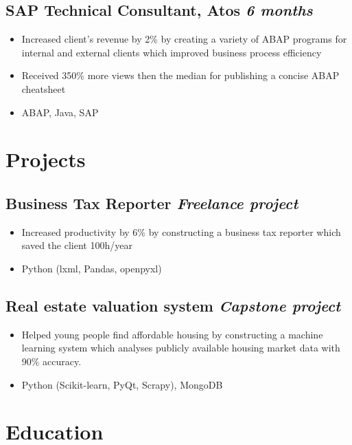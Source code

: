 \documentclass[a4paper]{article}
\newcommand{\bolditalicpair}
[2]
{\textbf{#1} \texorpdfstring{\hfill}{} \textit{#2}}
\begin{document}
\subsection{\bolditalicpair{SAP Technical Consultant, Atos}{6 months}}

\begin{itemize}
  \item Increased client's revenue by 2\% by creating a variety of ABAP programs for internal and external clients which improved business process efficiency
  \item Received 350\% more views then the median for publishing a concise ABAP cheatsheet
  \item ABAP, Java, SAP
\end{itemize}



\section{Projects}
\subsection{\bolditalicpair{Business Tax Reporter}{Freelance project}}

\begin{itemize}
  \item Increased productivity by 6\% by constructing a business tax reporter which saved the client 100h/year
  \item Python (lxml, Pandas, openpyxl)
\end{itemize}

\subsection{\bolditalicpair{Real estate valuation system}{Capstone project}}

\begin{itemize}
  \item Helped young people find affordable housing by constructing a machine learning system which analyses publicly available housing market data with 90\% accuracy.
  \item Python (Scikit-learn, PyQt, Scrapy), MongoDB
\end{itemize}



\section{Education}
\end{document}
